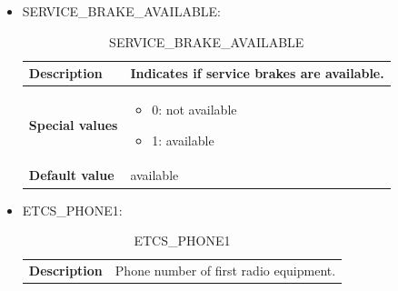 \documentclass{template/openetcs}
\begin{document}
\begin{itemize}
		\item SERVICE\_BRAKE\_AVAILABLE:
								
			\begin{longtable}{|l|l|}
				\caption{SERVICE\_BRAKE\_AVAILABLE}\\ 
				\hline
				
					\begin{minipage}[t]{0.22\linewidth} \textbf{Description}	\end{minipage} 
				&	\begin{minipage}[t]{0.78\linewidth} Indicates if service brakes are available. \end{minipage} \\
				
				\hline
																																									
					\begin{minipage}[t]{0.22\linewidth} \textbf{Special values}	\end{minipage} 
				&	\begin{minipage}[t]{0.78\linewidth} \begin{itemize} \item 0: not available \item 1: available \end{itemize} \end{minipage} \\
				
				\hline
				
					\begin{minipage}[t]{0.22\linewidth} \textbf{Default value}	\end{minipage} 
				&	\begin{minipage}[t]{0.78\linewidth} available \end{minipage} \\
				
				\hline
				
			\end{longtable}
			
		\item ETCS\_PHONE1:
										
			\begin{longtable}{|l|l|}
				\caption{ETCS\_PHONE1}\\ 
				\hline
				
					\begin{minipage}[t]{0.22\linewidth} \textbf{Description}	\end{minipage} 
				&	\begin{minipage}[t]{0.78\linewidth} Phone number of first radio equipment. \end{minipage} \\
				

\end{longtable}
\end{itemize}
\end{document}
